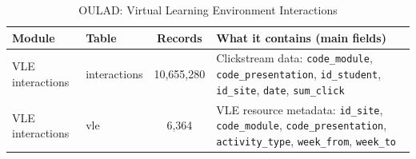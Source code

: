 \begin{table}[H]
    \centering
    \small
    \setlength{\tabcolsep}{1pt}
    \renewcommand{\arraystretch}{1.18}
    \begin{tabularx}{\linewidth}{|l|l|c|X|}
    \hline
    \textbf{Module} & \textbf{Table} & \textbf{Records} & \textbf{What it contains (main fields)} \\ \hline
    VLE interactions & interactions & 10,655,280 & Clickstream data: \texttt{code\_module}, \texttt{code\_presentation}, \texttt{id\_student}, \texttt{id\_site}, \texttt{date}, \texttt{sum\_click} \\ \hline
    VLE interactions & vle & 6,364 & VLE resource metadata: \texttt{id\_site}, \texttt{code\_module}, \texttt{code\_presentation}, \texttt{activity\_type}, \texttt{week\_from}, \texttt{week\_to} \\ \hline
    \end{tabularx}
    \caption{OULAD: Virtual Learning Environment Interactions}
    \label{tab:vle}
\end{table}

